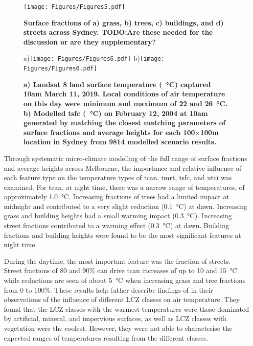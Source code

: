 \documentclass[final,3p,times,authoryear]{elsarticle}
\begin{document}
\begin{figure}
\centering
\texttt{[image: Figures/Figures5.pdf]}
\caption{\bf Surface fractions of a) grass, b) trees, c) buildings, and d) streets across Sydney. TODO:Are these needed for the discussion or are they supplementary?}
 \label{fig:sydfracs}
\end{figure}

\begin{figure} 
\centering
a)\texttt{[image: Figures/Figures6.pdf]}
b)\texttt{[image: Figures/Figures6.pdf]}
\caption{\bf a) Landsat 8 land surface temperature (\SI{}{\degreeCelsius}) captured 10am March 11, 2019. Local conditions of air temperature on this day were minimum and maximum of 22 and 26\SI{}{\degreeCelsius}. b) Modelled \gls{tsfc} (\SI{}{\degreeCelsius}) on February 12, 2004 at 10am generated by matching the closest matching parameters of surface fractions and average heights for each 100$\times$100m location in Sydney from 9814 modelled scenario results.}
 \label{fig:Sydney-Landsat-LST-11-03-2019}
 \label{fig:Sydney_TSFC12_85}
\end{figure}

Through systematic micro-climate modelling of the full range of surface fractions and average heights across Melbourne, the importance and relative influence of each feature type on the temperature types of \gls{tcan}, \gls{tmrt}, \gls{tsfc}, and \gls{utci} was examined. For \gls{tcan}, at night time, there was a narrow range of temperatures, of approximately 1.0\SI{}{\degreeCelsius}. Increasing fractions of trees had a limited impact at midnight and contributed to a very slight reduction (0.1\SI{}{\degreeCelsius}) at dawn. Increasing grass and building heights had a small warming impact (0.3\SI{}{\degreeCelsius}). Increasing street fractions contributed to a warming effect (0.3\SI{}{\degreeCelsius}) at dawn. Building fractions and building heights were found to be the most significant features at night time.

During the daytime, the most important feature was the fraction of streets. Street fractions of 80 and 90\% can drive \gls{tcan} increases of up to 10 and 15\SI{}{\degreeCelsius} while reductions are seen of about 5\SI{}{\degreeCelsius} when increasing grass and tree fractions from 0 to 100\%. These results help futher describe findings of \cite{Emery2021} in their observations of the influence of different LCZ classes on air temperature. They found that the LCZ classes with the warmest temperatures were those dominated by artificial, mineral, and impervious surfaces, as well as LCZ classes with vegetation were the coolest. However, they were not able to characterise the expected ranges of temperatures resulting from the different classes.
\end{document}
